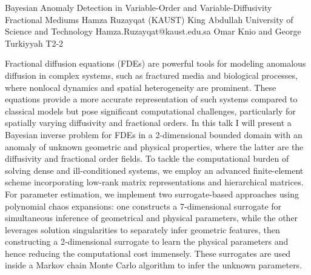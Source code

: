 \begin{talk}
  {Bayesian Anomaly Detection in Variable-Order and Variable-Diffusivity Fractional Mediums}%
  {Hamza Ruzayqat}%
  {(KAUST) King Abdullah University of Science and Technology}%
  {Hamza.Ruzayqat@kaust.edu.sa}%
  {Omar Knio and George Turkiyyah }%
  {T2-2}%
			
Fractional diffusion equations (FDEs) are powerful tools for modeling anomalous diffusion in complex systems, such as fractured media and biological processes, where nonlocal dynamics and spatial heterogeneity are prominent. These equations provide a more accurate representation of such systems compared to classical models but pose significant computational challenges, particularly for spatially varying diffusivity and fractional orders. In this talk I will present a Bayesian inverse problem for FDEs in a 2-dimensional bounded domain with an anomaly of unknown geometric and physical properties, where the latter are the diffusivity and fractional order fields. To tackle the computational burden of solving dense and ill-conditioned systems, we employ an advanced finite-element scheme incorporating low-rank matrix representations and hierarchical matrices. For parameter estimation, we implement two surrogate-based approaches using polynomial chaos expansions: one constructs a 7-dimensional surrogate for simultaneous inference of geometrical and physical parameters, while the other leverages solution singularities to separately infer geometric features, then constructing a 2-dimensional surrogate to learn the physical parameters and hence reducing the computational cost immensely. These surrogates are used inside a Markov chain Monte Carlo algorithm to infer the unknown parameters.

\medskip

\end{talk}

